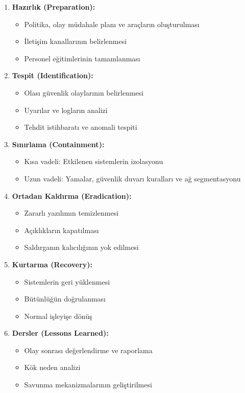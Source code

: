\begin{enumerate}
    \item \textbf{Hazırlık (Preparation):}
    \begin{itemize}
        \item Politika, olay müdahale planı ve araçların oluşturulması
        \item İletişim kanallarının belirlenmesi
        \item Personel eğitimlerinin tamamlanması
    \end{itemize}

    \item \textbf{Tespit (Identification):}
    \begin{itemize}
        \item Olası güvenlik olaylarının belirlenmesi
        \item Uyarılar ve logların analizi
        \item Tehdit istihbaratı ve anomali tespiti
    \end{itemize}

    \item \textbf{Sınırlama (Containment):}
    \begin{itemize}
        \item Kısa vadeli: Etkilenen sistemlerin izolasyonu
        \item Uzun vadeli: Yamalar, güvenlik duvarı kuralları ve ağ segmentasyonu
    \end{itemize}

    \item \textbf{Ortadan Kaldırma (Eradication):}
    \begin{itemize}
        \item Zararlı yazılımın temizlenmesi
        \item Açıklıkların kapatılması
        \item Saldırganın kalıcılığının yok edilmesi
    \end{itemize}

    \item \textbf{Kurtarma (Recovery):}
    \begin{itemize}
        \item Sistemlerin geri yüklenmesi
        \item Bütünlüğün doğrulanması
        \item Normal işleyişe dönüş
    \end{itemize}

    \item \textbf{Dersler (Lessons Learned):}
    \begin{itemize}
        \item Olay sonrası değerlendirme ve raporlama
        \item Kök neden analizi
        \item Savunma mekanizmalarının geliştirilmesi
    \end{itemize}
\end{enumerate}

